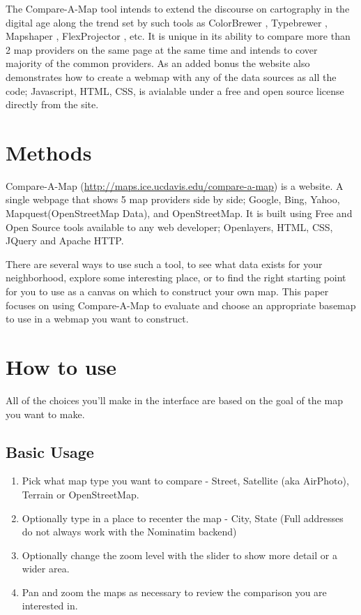 \documentclass[12pt,letterpaper]{article}
\begin{document}
	  The Compare-A-Map tool intends to extend the discourse on cartography in the digital age along the trend set by such tools as ColorBrewer \parencite{Harrower2003}, Typebrewer \parencite{Sheesley2008}, Mapshaper \parencite{Bloch2006}, FlexProjector \parencite{Jenny2010} , etc. It is unique in its ability to compare more than 2 map providers on the same page at the same time and intends to cover majority of the common providers. As an added bonus the website also demonstrates how to create a webmap with any of the data sources as all the code; Javascript, HTML, CSS, is avialable under a free and open source license directly from the site.
	


\section{Methods}
Compare-A-Map (\url{http://maps.ice.ucdavis.edu/compare-a-map}) is a website. A single webpage that shows 5 map providers side by side;
Google, Bing, Yahoo, Mapquest(OpenStreetMap Data), and OpenStreetMap. It is built using Free and Open Source tools available to any web developer; Openlayers, HTML, CSS, JQuery and Apache HTTP.

There are several ways to use such a tool, to see what data exists for your neighborhood, explore some interesting place, or to find the right starting point for you to use as a canvas on which to construct your own map. This paper focuses on using Compare-A-Map to evaluate and choose an appropriate basemap to use in a webmap you want to construct.

\section{How to use}
All of the choices you'll make in the interface are based on the goal of the map you want to make.

\subsection{Basic Usage}
\begin{enumerate}
\item Pick what map type you want to compare - Street, Satellite (aka AirPhoto), Terrain or OpenStreetMap.
\item Optionally type in a place to recenter the map - City, State (Full addresses do not always work with the Nominatim backend) %
\item Optionally change the zoom level with the slider to show more detail or a wider area.
\item Pan and zoom the maps as necessary to review the comparison you are interested in.
\end{enumerate}
\end{document}
